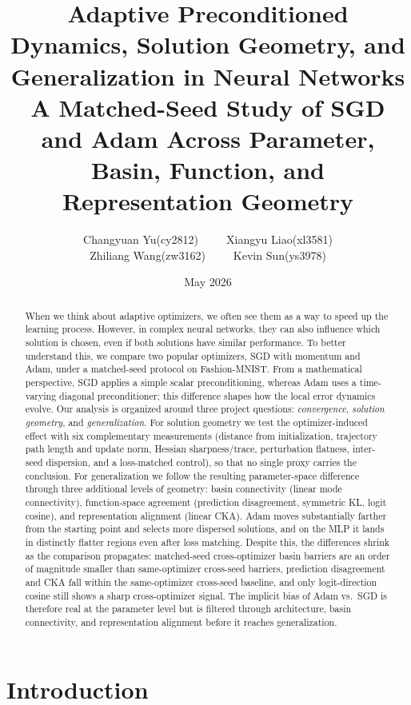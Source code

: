 \documentclass[11pt]{article}
\title{\textbf{Adaptive Preconditioned Dynamics, Solution Geometry, and Generalization in Neural Networks}\\
\Large A Matched-Seed Study of SGD and Adam Across Parameter, Basin, Function, and Representation Geometry}
\author{Changyuan Yu(cy2812)~~~~~Xiangyu Liao(xl3581)\\Zhiliang Wang(zw3162)~~~~~Kevin Sun(ys3978)}
\date{May 2026}
\begin{document}
\maketitle

\begin{abstract}
When we think about adaptive optimizers, we often see them as a way to speed up the learning process. However, in complex neural networks, they can also influence which solution is chosen, even if both solutions have similar performance. To better understand this, we compare two popular optimizers, SGD with momentum and Adam, under a matched-seed protocol on Fashion-MNIST. From a mathematical perspective, SGD applies a simple scalar preconditioning, whereas Adam uses a time-varying diagonal preconditioner; this difference shapes how the local error dynamics evolve. Our analysis is organized around three project questions: \emph{convergence}, \emph{solution geometry}, and \emph{generalization}. For solution geometry we test the optimizer-induced effect with six complementary measurements (distance from initialization, trajectory path length and update norm, Hessian sharpness/trace, perturbation flatness, inter-seed dispersion, and a loss-matched control), so that no single proxy carries the conclusion. For generalization we follow the resulting parameter-space difference through three additional levels of geometry: basin connectivity (linear mode connectivity), function-space agreement (prediction disagreement, symmetric KL, logit cosine), and representation alignment (linear CKA). Adam moves substantially farther from the starting point and selects more dispersed solutions, and on the MLP it lands in distinctly flatter regions even after loss matching. Despite this, the differences shrink as the comparison propagates: matched-seed cross-optimizer basin barriers are an order of magnitude smaller than same-optimizer cross-seed barriers, prediction disagreement and CKA fall within the same-optimizer cross-seed baseline, and only logit-direction cosine still shows a sharp cross-optimizer signal. The implicit bias of Adam vs.\ SGD is therefore real at the parameter level but is filtered through architecture, basin connectivity, and representation alignment before it reaches generalization.
\end{abstract}

\section{Introduction}
\end{document}
